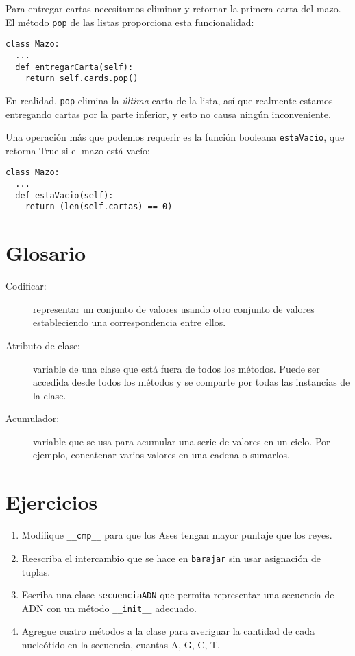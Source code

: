  

Para entregar cartas necesitamos eliminar y retornar la primera carta
del mazo. El método \texttt{pop} de las listas proporciona esta funcionalidad:
\begin{lstlisting}
class Mazo:
  ...
  def entregarCarta(self):
    return self.cards.pop()
\end{lstlisting}
 En realidad, \texttt{pop} elimina la {\em última} carta de la
lista, así que realmente estamos entregando cartas por la parte inferior,
y esto no causa ningún inconveniente.

 

Una operación más que podemos requerir es la función booleana \texttt{estaVacio},
que retorna True si el mazo está vacío:

\begin{lstlisting}
class Mazo:
  ...
  def estaVacio(self):
    return (len(self.cartas) == 0)
\end{lstlisting}
\section{Glosario}
\begin{description}
\item [{Codificar:}] representar un conjunto de valores usando otro conjunto
de valores estableciendo una correspondencia entre ellos.
\item [{Atributo de clase:}] variable de una clase que está fuera de todos
los métodos. Puede ser accedida desde todos los métodos y se comparte
por todas las instancias de la clase.
\item [{Acumulador:}] variable que se usa para acumular una serie de valores
en un ciclo. Por ejemplo, concatenar varios valores en una cadena
o sumarlos.

  
\end{description}

\section{Ejercicios}
\begin{enumerate}
\item Modifique \texttt{\_\_cmp\_\_} para que los Ases tengan mayor puntaje
que los reyes.
\item Reescriba el intercambio que se hace en \texttt{barajar} sin usar
asignación de tuplas.
\item Escriba una clase \texttt{secuenciaADN} que permita representar una
secuencia de ADN con un método \texttt{\_\_init\_\_} adecuado.
\item Agregue cuatro métodos a la clase para averiguar la cantidad de cada
nucleótido en la secuencia, cuantas A, G, C, T.
\end{enumerate}

